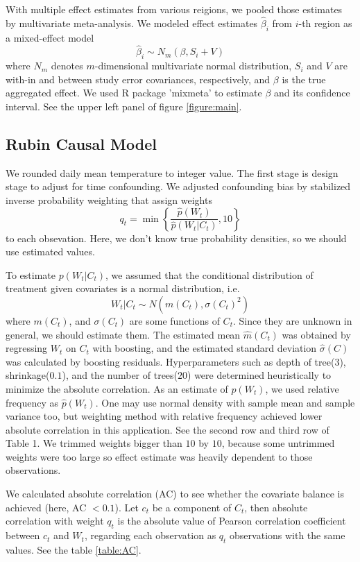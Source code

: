 \documentclass[12pt]{article}
\begin{document}
With multiple effect estimates from various reigions,
we pooled those estimates by multivariate meta-analysis.
We modeled effect estimates $\hat{\beta}_i$ from $i$-th region as a mixed-effect model
\[
	\hat{\beta}_i \sim N_m(\beta, S_i + V)
\]
where $N_m$ denotes $m$-dimensional multivariate normal distribution,
$S_i$ and $V$ are with-in and between study error covariances, respectively,
and $\beta$ is the true aggregated effect.
We used R package 'mixmeta' to estimate $\beta$ and its confidence interval.
See the upper left panel of figure \ref{figure:main}.

\subsection{Rubin Causal Model}

We rounded daily mean temperature to integer value.
The first stage is design stage to adjust for time confounding.
We adjusted confounding bias by stabilized inverse probability weighting\cite{sipw2010}
that assign weights
\[
	q_t = \min{ \left \{ \frac{\hat{p}(W_t)}{\hat{p}(W_t \lvert C_t)}, 10 \right \} }
\]
to each obsevation.
Here, we don't know true probability densities,
so we should use estimated values.

To estimate $p(W_t \lvert C_t)$, 
we assumed that 
the conditional distribution of treatment given covariates is a normal distribution, i.e.
\[ 
	W_t\lvert C_t \sim N(m(C_t), \sigma(C_t)^2) 
\] 
where $m(C_t)$, and $\sigma(C_t)$ are some functions of $C_t$.
Since they are unknown in general, we should estimate them. 
The estimated mean $\hat{m}(C_t)$ was obtained by regressing $W_t$ on $C_t$ with boosting, 
and the estimated standard deviation $\hat{\sigma}(C)$ was calculated
by boosting residuals\cite{hirano2004, gpsboosting2015}.
Hyperparameters such as depth of tree($3$), shrinkage($0.1$), and the number of trees($20$) 
were determined heuristically to minimize the absolute correlation.
As an estimate of $p(W_t)$, we used relative frequency as $\hat{p}(W_t)$.
One may use normal density with sample mean and sample variance too, but
weighting method with relative frequency achieved lower absolute correlation in this application.
See the second row and third row of Table 1.
We trimmed weights bigger than $10$ by $10$,
because some untrimmed weights were too large so
effect estimate was heavily dependent to those observations.

We calculated absolute correlation (AC)\cite{gpsboosting2015} 
to see whether the covariate balance is achieved (here, AC $<0.1$).
Let $c_t$ be a component of $C_t$, then absolute correlation with weight $q_t$ is
the absolute value of Pearson correlation coefficient between $c_t$ and $W_t$,
regarding each observation as $q_t$ observations with the same values.
See the table \ref{table:AC}.
\end{document}
